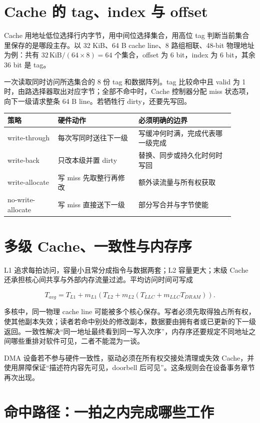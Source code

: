 \section{Cache 的 tag、index 与 offset}

Cache 用地址低位选择行内字节，用中间位选择集合，用高位 tag 判断当前集合里保存的是哪段主存。以 32 KiB、64 B cache line、8 路组相联、48-bit 物理地址为例：共有 $32\,\text{KiB}/(64\times8)=64$ 个集合，offset 为 6 bit，index 为 6 bit，其余 36 bit 是 tag。

一次读取同时访问所选集合的 8 份 tag 和数据阵列。tag 比较命中且 valid 为 1 时，由路选择器取出对应字节；全部不命中时，Cache 控制器分配 miss 状态项，向下一级请求整条 64 B line。若牺牲行 dirty，还要先写回。

\begin{longtable}{L{0.2\linewidth}L{0.32\linewidth}L{0.38\linewidth}}
\toprule
策略 & 硬件动作 & 必须明确的边界 \\
\midrule
write-through & 每次写同时送往下一级 & 写缓冲何时满，完成代表哪一级完成 \\
write-back & 只改本级并置 dirty & 替换、同步或持久化时何时写回 \\
write-allocate & 写 miss 先取整行再修改 & 额外读流量与所有权获取 \\
no-write-\allowbreak allocate & 写 miss 直接送下一级 & 部分写合并与字节使能 \\
\bottomrule
\end{longtable}

\section{多级 Cache、一致性与内存序}

L1 追求每拍访问，容量小且常分成指令与数据两套；L2 容量更大；末级 Cache 还承担核心间共享与外部内存流量过滤。平均访问时间可写成

\[
T_{avg}=T_{L1}+m_{L1}(T_{L2}+m_{L2}(T_{LLC}+m_{LLC}T_{DRAM})).
\]

多核中，同一物理 cache line 可能被多个核心保存。写者必须先取得独占所有权，使其他副本失效；读者若命中别处的修改副本，数据要由拥有者或已更新的下一级返回。一致性解决“同一地址最终看到同一写入次序”，内存序还要规定不同地址之间哪些重排对软件可见，二者不能混为一谈。

DMA 设备若不参与硬件一致性，驱动必须在所有权交接处清理或失效 Cache，并使用屏障保证“描述符内容先可见，doorbell 后可见”。这条规则会在设备事务章节再次出现。

\section{命中路径：一拍之内完成哪些工作}

